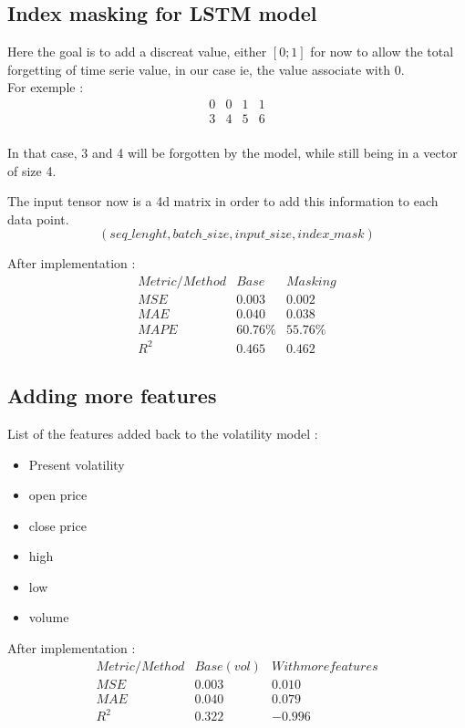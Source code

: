 \documentclass[letterpaper,11pt]{article}
\begin{document}
\subsection*{Index masking for LSTM model}
Here the goal is to add a discreat value, either $[0;1]$ for now to allow the total forgetting of time serie value, in our case ie, the value associate with 0.\\
For exemple : 
\[
\begin{array}{cccc}
0 & 0 & 1 & 1\\
3 & 4 & 5 & 6 \\
\end{array}
\]

In that case, 3 and 4 will be forgotten by the model, while still being in a vector of size 4.\\

\bigskip

The input tensor now is a 4d matrix in order to add this information to each data point.
\[
(seq\_lenght, batch\_size, input\_size, index\_mask)
\]

After implementation :
\bigskip
\[
\begin{array}{ccc}
Metric/Method & Base & Masking \\
\hline
MSE & 0.003 & 0.002\\
MAE & 0.040 & 0.038 \\
MAPE & 60.76\% & 55.76\%  \\
R^{2} & 0.465 & 0.462 
\end{array}
\]

\bigskip


\subsection*{Adding more features}

List of the features added back to the volatility model :

\begin{multicols}{2}
\begin{itemize}
  \item Present volatility
  \item open price
  \item close price
  \item high
  \item low
  \item volume
\end{itemize}
\end{multicols}

After implementation :
\bigskip
\[
\begin{array}{ccc}
Metric/Method & Base (vol) & With more features \\
\hline
MSE & 0.003 & 0.010\\
MAE & 0.040 & 0.079 \\
R^{2} & 0.322 & -0.996 
\end{array}
\]
\end{document}
